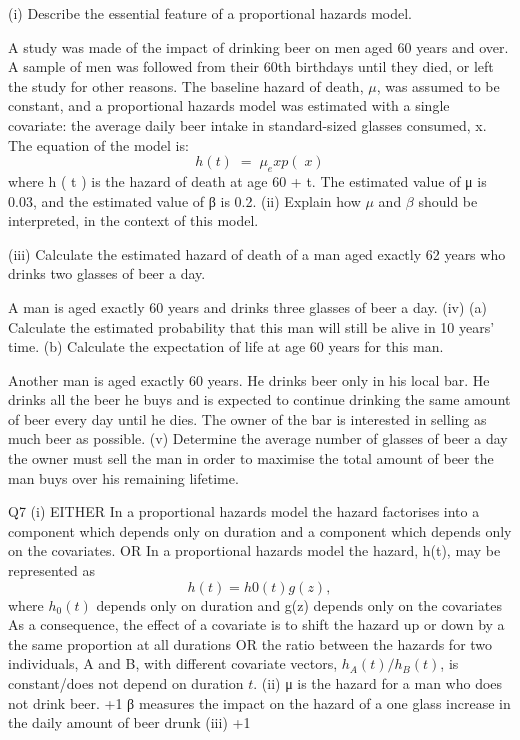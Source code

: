 \documentclass[a4paper,12pt]{article}
\begin{document}
(i)
Describe the essential feature of a proportional hazards model.

A study was made of the impact of drinking beer on men aged 60 years and over. A sample of men was followed from their 60th birthdays until they died, or left the study for other reasons. The baseline hazard of death, $\mu$, was assumed to be constant, and a proportional hazards model was estimated with a single covariate: the average daily
beer intake in standard-sized glasses consumed, x. The equation of the model is:
\[h ( t ) \;=\; \mu_ exp(  x )\]
where h ( t ) is the hazard of death at age 60 + t.
The estimated value of μ is 0.03, and the estimated value of β is 0.2.
(ii) Explain how $\mu$ and $\beta$ should be interpreted, in the context of this model.

(iii) Calculate the estimated hazard of death of a man aged exactly 62 years who
drinks two glasses of beer a day.

A man is aged exactly 60 years and drinks three glasses of beer a day.
(iv)
(a) Calculate the estimated probability that this man will still be alive in 10 years’ time.
(b) Calculate the expectation of life at age 60 years for this man.

Another man is aged exactly 60 years. He drinks beer only in his local bar. He drinks all the beer he buys and is expected to continue drinking the same amount of beer every day until he dies. The owner of the bar is interested in selling as much beer as
possible.
(v)
Determine the average number of glasses of beer a day the owner must sell the
man in order to maximise the total amount of beer the man buys over his
remaining lifetime.


\newpage

Q7
(i)
EITHER
In a proportional hazards model the hazard factorises  into a component which depends only on duration and a
component which depends only on the covariates. 
OR
In a proportional hazards model the hazard, h(t), may be represented as
\[h(t) = h 0 (t)g(z),\] 
where $h_0 (t)$ depends only on duration and g(z) depends only on the covariates 
As a consequence, the effect of a covariate is to shift the hazard up or down by a the same proportion at all durations OR the ratio between the hazards for two individuals, A and B, with different
covariate vectors, $h_A (t)/h_B (t)$, is constant/does not depend on duration $t$.
(ii)
μ is the hazard for a man who does not drink beer.
+1
β measures the impact on the hazard of a one glass increase in the daily
amount of beer drunk
(iii)
+1
\end{document}
